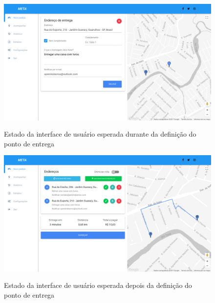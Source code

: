 \begin{apendicesenv}
		\begin{figure}[!h]
			\centering
			\caption{Estado da interface de usuário esperada durante da definição do ponto de entrega}
			\includegraphics[width=1\textwidth]{./img/durante-entrega}
			\label{fig:durante-entrega}
		\end{figure}
		
		\begin{figure}[!h]
			\centering
			\caption{Estado da interface de usuário esperada depois da definição do ponto de entrega}
			\includegraphics[width=1\textwidth]{./img/depois-entrega}
			\label{fig:depois-entrega}
		\end{figure}
		

\end{apendicesenv}
